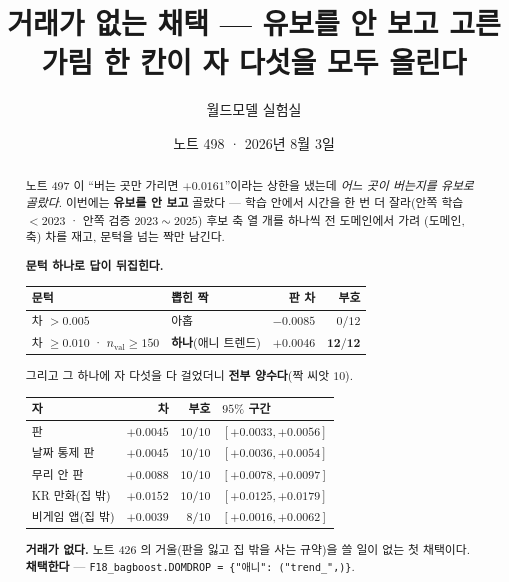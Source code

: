 \documentclass[11pt]{article}
\begin{document}
\title{거래가 없는 채택 --- 유보를 안 보고 고른 가림 한 칸이 자 다섯을 모두 올린다}
\author{월드모델 실험실}
\date{노트 498 · 2026년 8월 3일}
\maketitle

\begin{abstract}
노트 497 이 ``버는 곳만 가리면 $+0.0161$''이라는 상한을 냈는데 \emph{어느
곳이 버는지를 유보로 골랐다}. 이번에는 \textbf{유보를 안 보고} 골랐다 ---
학습 안에서 시간을 한 번 더 잘라(안쪽 학습 $<\!2023$ · 안쪽 검증
$2023\!\sim\!2025$) 후보 축 열 개를 하나씩 전 도메인에서 가려 (도메인, 축)
차를 재고, 문턱을 넘는 짝만 남긴다.

\textbf{문턱 하나로 답이 뒤집힌다.}

\begin{center}
\begin{tabular}{llrr}
\hline
문턱 & 뽑힌 짝 & 판 차 & 부호 \\
\hline
차 $> 0.005$ & 아홉 & $-0.0085$ & $0/12$ \\
차 $\geq 0.010$ · $n_{\text{val}} \geq 150$ & \textbf{하나}(애니 트렌드) & $\mathbf{+0.0046}$ & $\mathbf{12/12}$ \\
\hline
\end{tabular}
\end{center}

그리고 그 하나에 자 다섯을 다 걸었더니 \textbf{전부 양수다}(짝 씨앗 $10$).

\begin{center}
\begin{tabular}{lrrl}
\hline
자 & 차 & 부호 & $95\%$ 구간 \\
\hline
판 & $+0.0045$ & $10/10$ & $[+0.0033, +0.0056]$ \\
날짜 통제 판 & $+0.0045$ & $10/10$ & $[+0.0036, +0.0054]$ \\
무리 안 판 & $\mathbf{+0.0088}$ & $10/10$ & $[+0.0078, +0.0097]$ \\
KR 만화(집 밖) & $\mathbf{+0.0152}$ & $10/10$ & $[+0.0125, +0.0179]$ \\
비게임 앱(집 밖) & $+0.0039$ & $8/10$ & $[+0.0016, +0.0062]$ \\
\hline
\end{tabular}
\end{center}

\textbf{거래가 없다.} 노트 426 의 거울(판을 잃고 집 밖을 사는 규약)을 쓸
일이 없는 첫 채택이다. \textbf{채택한다} --- \texttt{F18\_bagboost.DOMDROP
= \{"애니": ("trend\_",)\}}.
\end{abstract}
\end{document}
